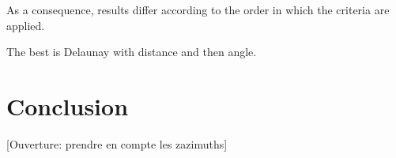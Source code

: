 \documentclass[lettersize,journal,english]{IEEEtran}
\begin{document}
As a consequence, results differ according to the order in which the criteria are applied.

The best is Delaunay with distance and then angle.



\section{Conclusion}

[Ouverture: prendre en compte les zazimuths]

\printglossary[type=\acronymtype]
\printglossary



\end{document}
